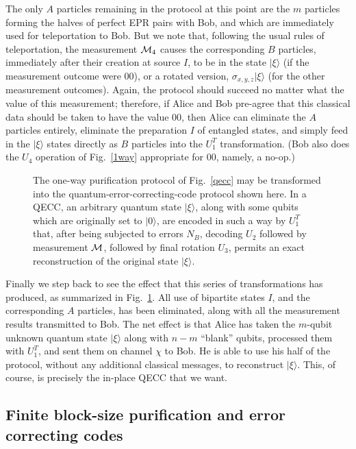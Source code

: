 The only $A$ particles remaining in the protocol at this point are the
$m$ particles forming the halves of perfect EPR pairs with Bob, and
which are immediately used for teleportation to Bob.  But we note
that, following the usual rules of teleportation, the measurement
${\cal M}_4$ causes the corresponding $B$ particles, immediately after
their creation at source $I$, to be in the state $|\xi\rangle$ (if the
measurement outcome were 00), or a rotated version,
$\sigma_{x,y,z}|\xi\rangle$ (for the other measurement outcomes).
Again, the protocol should succeed no matter what the value of this
measurement; therefore, if Alice and Bob pre-agree that this classical
data should be taken to have the value 00, then Alice can eliminate
the $A$ particles entirely, eliminate the preparation $I$ of entangled
states, and simply feed in the $|\xi\rangle$ states directly as $B$
particles into the $U_1^T$ transformation.  (Bob also does the $U_4$
operation of Fig.~\ref{1way} appropriate for 00, namely, a no-op.)
 
\begin{figure}[htbp]
\centerline{}
\caption[EPP8.eps: 1-EPP into QECC]{The one-way purification protocol of Fig.~\protect\ref{qecc}
may be transformed into the quantum-error-correcting-code protocol
shown here.  In a QECC, an arbitrary quantum state $|\xi\rangle$,
along with some qubits which are originally set to $|0\rangle$, are
encoded in such a way by $U_1^T$ that, after being subjected to errors
$N_B$, decoding $U_2$ followed by measurement $\cal M$,
followed by final rotation $U_3$, permits an exact reconstruction of
the original state $|\xi\rangle$.}
\label{qeccf}
\end{figure}
 
Finally we step back to see the effect that this series of
transformations has produced, as summarized in Fig.~\ref{qeccf}.  All
use of bipartite states $I$, and the corresponding $A$ particles, has
been eliminated, along with all the measurement results transmitted to
Bob.  The net effect is that Alice has taken the $m$-qubit unknown
quantum state $|\xi\rangle$ along with $n\!-\!m$ ``blank'' qubits,
processed them with $U_1^T$, and sent them on channel $\chi$ to Bob.  He
is able to use his half of the protocol, without any additional
classical messages, to reconstruct $|\xi\rangle$.  This, of course, is
precisely the in-place QECC that we want.
 
\subsection{Finite block-size purification and error correcting codes}
\label{subsec:MC}
 
